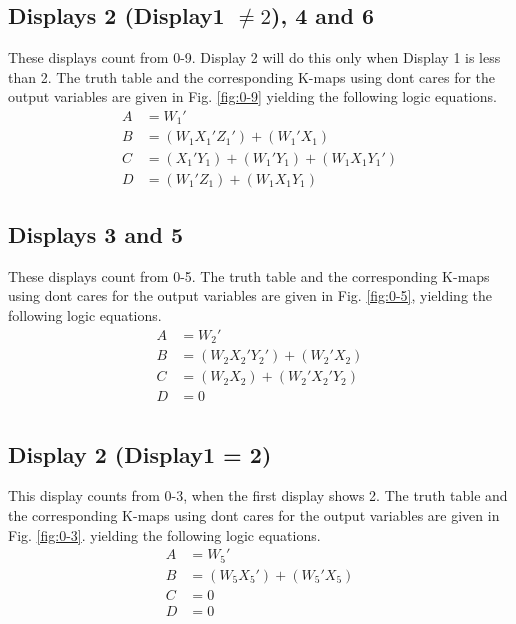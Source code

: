 
\subsection{Displays 2 (Display1 $\ne 2$), 4 and 6}
These displays count from 0-9.  Display 2 will do this only when Display 1 is less than 2.
The truth table 
and the corresponding K-maps using dont cares for the output variables are given in 
Fig. \ref{fig:0-9}
yielding the following logic equations.
\begin{align}
    A &= W_1' \\
    B &= (W_1 X_1' Z_1') + (W_1' X_1) \\
    C &= (X_1' Y_1) + (W_1' Y_1) + (W_1 X_1 Y_1') \\
    D &= (W_1' Z_1) + (W_1 X_1 Y_1) 
\end{align}

\subsection{Displays 3 and 5}
These displays count from 0-5.  
The truth table 
and the corresponding K-maps using dont cares for the output variables are given in 
Fig. \ref{fig:0-5},
yielding the following logic equations.
\begin{align}
    A &= W_2' \\
    B &= (W_2 X_2' Y_2') + (W_2' X_2) \\
    C &= (W_2 X_2) + (W_2' X_2' Y_2) \\
    D &= 0 \\
\end{align}

\subsection{Display 2 (Display1 = 2)}
This display counts from 0-3, when the first display shows 2.  
The truth table 
and the corresponding K-maps using dont cares for the output variables are given in 
Fig. \ref{fig:0-3}.
yielding the following logic equations.
\begin{align}
    A &= W_5' \\
    B &= (W_5 X_5') + (W_5' X_5) \\
    C &= 0 \\
    D &= 0 
\end{align}
%

